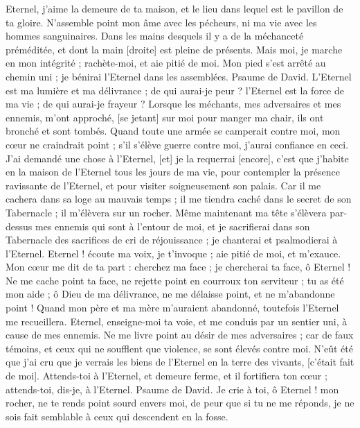 \begin{multicols}{2}
Eternel, j'aime la demeure de ta maison, et le lieu dans lequel est le pavillon de ta gloire.
N'assemble point mon âme avec les pécheurs, ni ma vie avec les hommes sanguinaires.
Dans les mains desquels il y a de la méchanceté préméditée, et dont la main [droite] est pleine de présents.
Mais moi, je marche en mon intégrité ; rachète-moi, et aie pitié de moi.
Mon pied s'est arrêté au chemin uni ; je bénirai l'Eternel dans les assemblées.
\VerseOne{}Psaume de David. L'Eternel est ma lumière et ma délivrance ; de qui aurai-je peur ? l'Eternel est la force de ma vie ; de qui aurai-je frayeur ?
Lorsque les méchants, mes adversaires et mes ennemis, m'ont approché, [se jetant] sur moi pour manger ma chair, ils ont bronché et sont tombés.
Quand toute une armée se camperait contre moi, mon cœur ne craindrait point ; s'il s'élève guerre contre moi, j'aurai confiance en ceci.
J'ai demandé une chose à l'Eternel, [et] je la requerrai [encore], c'est que j'habite en la maison de l'Eternel tous les jours de ma vie, pour contempler la présence ravissante de l'Eternel, et pour visiter soigneusement son palais.
Car il me cachera dans sa loge au mauvais temps ; il me tiendra caché dans le secret de son Tabernacle ; il m'élèvera sur un rocher.
Même maintenant ma tête s'élèvera par-dessus mes ennemis qui sont à l'entour de moi, et je sacrifierai dans son Tabernacle des sacrifices de cri de réjouissance ; je chanterai et psalmodierai à l'Eternel.
Eternel ! écoute ma voix, je t'invoque ; aie pitié de moi, et m'exauce.
Mon cœur me dit de ta part : cherchez ma face ; je chercherai ta face, ô Eternel !
Ne me cache point ta face, ne rejette point en courroux ton serviteur ; tu as été mon aide ; ô Dieu de ma délivrance, ne me délaisse point, et ne m'abandonne point !
Quand mon père et ma mère m'auraient abandonné, toutefois l'Eternel me recueillera.
Eternel, enseigne-moi ta voie, et me conduis par un sentier uni, à cause de mes ennemis.
Ne me livre point au désir de mes adversaires ; car de faux témoins, et ceux qui ne soufflent que violence, se sont élevés contre moi.
N'eût été que j'ai cru que je verrais les biens de l'Eternel en la terre des vivants, [c'était fait de moi].
Attends-toi à l'Eternel, et demeure ferme, et il fortifiera ton cœur ; attends-toi, dis-je, à l'Eternel.
\VerseOne{}Psaume de David. Je crie à toi, ô Eternel ! mon rocher, ne te rends point sourd envers moi, de peur que si tu ne me réponds, je ne sois fait semblable à ceux qui descendent en la fosse.

\end{multicols}
